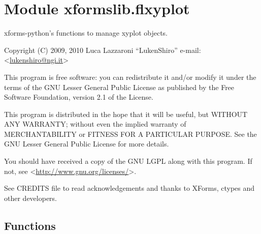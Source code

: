 %
%
%


\section{Module xformslib.flxyplot}

    \label{xformslib:flxyplot}

xforms-python's functions to manage xyplot objects.

Copyright (C) 2009, 2010  Luca Lazzaroni ``LukenShiro''
e-mail: <\href{mailto:lukenshiro@ngi.it}{lukenshiro@ngi.it}>

This program is free software: you can redistribute it and/or modify
it under the terms of the GNU Lesser General Public License as
published by the Free Software Foundation, version 2.1 of the License.

This program is distributed in the hope that it will be useful,
but WITHOUT ANY WARRANTY; without even the implied warranty of
MERCHANTABILITY or FITNESS FOR A PARTICULAR PURPOSE. See the
GNU Lesser General Public License for more details.

You should have received a copy of the GNU LGPL along with this
program. If not, see <\href{http://www.gnu.org/licenses/}{http://www.gnu.org/licenses/}>.

See CREDITS file to read acknowledgements and thanks to XForms,
ctypes and other developers.


  \subsection{Functions}

    \label{xformslib:flxyplot:fl_add_xyplot}

